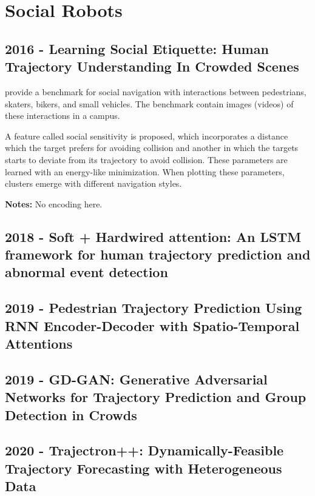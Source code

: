 \section{Social Robots}\label{sec: social robots}

\subsection*{2016 - Learning Social Etiquette: Human Trajectory Understanding In Crowded Scenes}

\cite{robicquet2016learning} provide a benchmark for social navigation with interactions between pedestrians, skaters, bikers, and small vehicles. 
%
The benchmark contain images (videos) of these interactions in a campus.

A feature called social sensitivity is proposed, which incorporates a distance which the target prefers for avoiding collision and another in which the targets starts to deviate from its trajectory to avoid collision.
%
These parameters are learned with an energy-like minimization.
%
When plotting these parameters, clusters emerge with different navigation styles.

\textbf{Notes:} No encoding here. 

\subsection*{2018 - Soft + Hardwired attention: An LSTM framework for human trajectory prediction and abnormal event detection}

\cite{fernando2018soft+}

\subsection*{2019 - Pedestrian Trajectory Prediction Using RNN Encoder-Decoder with Spatio-Temporal Attentions}

\cite{bhujel2019pedestrian}

\subsection*{2019 - GD-GAN: Generative Adversarial Networks for Trajectory Prediction and Group Detection in Crowds}

\cite{fernando2019gd}

\subsection*{2020 - Trajectron++: Dynamically-Feasible Trajectory Forecasting with Heterogeneous Data}

